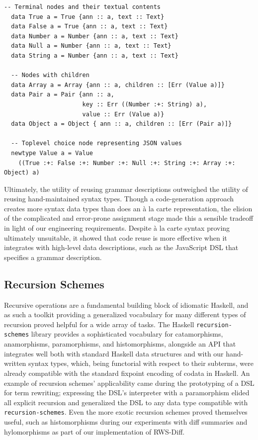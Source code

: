 \documentclass[acmsmall,fleqn,12pt]{acmart}
\begin{document}
\begin{lstlisting}[label={code:codegen}, keywords={type,data,newtype},
  title={
    A simplified representation of the syntax types generated
    from the Tree-sitter grammar for JSON.
  }
  ]
  -- Terminal nodes and their textual contents
  data True a = True {ann :: a, text :: Text}
  data False a = True {ann :: a, text :: Text}
  data Number a = Number {ann :: a, text :: Text}
  data Null a = Number {ann :: a, text :: Text}
  data String a = Number {ann :: a, text :: Text}

  -- Nodes with children
  data Array a = Array {ann :: a, children :: [Err (Value a)]}
  data Pair a = Pair {ann :: a,
                      key :: Err ((Number :+: String) a),
                      value :: Err (Value a)}
  data Object a = Object { ann :: a, children :: [Err (Pair a)]}

  -- Toplevel choice node representing JSON values
  newtype Value a = Value
    ((True :+: False :+: Number :+: Null :+: String :+: Array :+: Object) a)
\end{lstlisting}

Ultimately, the utility of reusing grammar descriptions outweighed the utility
of reusing hand-maintained syntax types. Though a code-generation approach
creates more syntax data types than does an à la carte representation, the
elision of the complicated and error-prone assignment stage made this a sensible
tradeoff in light of our engineering requirements. Despite à la carte syntax
proving ultimately unsuitable, it showed that code reuse is more effective when
it integrates with high-level data descriptions, such as the JavaScript DSL
that specifies a grammar description.



\subsection{Recursion Schemes} \label{sec:recschemes}

Recursive operations are a fundamental building block of idiomatic Haskell, and
as such a toolkit providing a generalized vocabulary for many different types of
recursion proved helpful for a wide array of tasks. The Haskell \texttt{recursion-schemes}
library provides a sophisticated vocabulary for catamorphisms, anamorphisms,
paramorphisms, and histomorphisms, alongside an API that integrates well
both with standard Haskell data structures and with our hand-written syntax
types, which, being functorial with respect to their subterms, were already
compatible with the standard fixpoint encoding of codata in Haskell. An example
of recursion schemes' applicability came during the prototyping of a DSL for
term rewriting; expressing the DSL's interpreter with a paramorphism elided all
explicit recursion and generalized the DSL to any data type compatible with
\texttt{recursion-schemes}. Even the more exotic recursion schemes proved
themselves useful, such as histomorphisms during our experiments with diff
summaries and hylomorphisms as part of our implementation of RWS-Diff.
\end{document}
